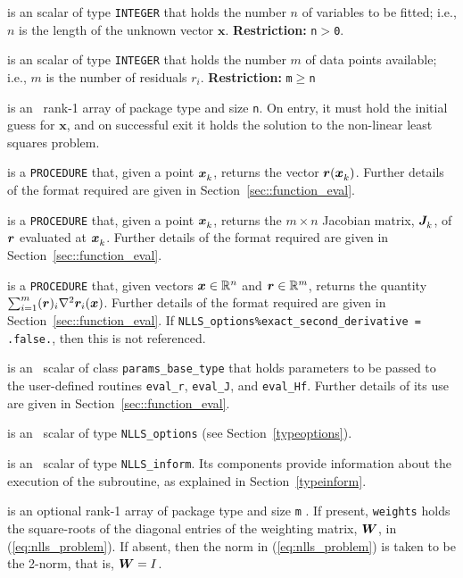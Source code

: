 \documentclass{spec}
\newcommand{\scalarintegerii}{is an \intentin scalar of type {\tt INTEGER} }
\newcommand{\ronearrayrealiiopt}[1]{is an optional \intentin rank-1 array of package type and size {\tt #1} }
\begin{document}
\begin{description}
 \scalarintegerii that holds the number $n$ of
variables to be fitted; i.e., $n$ is the length of the unknown vector $\bm x$.
\textbf{Restriction:} \texttt{n}$>${\tt 0}.

 \scalarintegerii that holds the number $m$ of
data points available; i.e., $m$ is the number of residuals $r_i$.
\textbf{Restriction:} \texttt{m}$\geq$\texttt{n}

 is an \intentinout\  rank-1 array of package type
and size {\tt n}.  On entry, it must hold the initial guess for $\bm x$, and on
successful exit it holds the solution to the non-linear least squares problem.

 is a {\tt PROCEDURE} that, given a point ${\bm x}_{k}^{}$, returns the vector ${\bm r}({\bm x}_{k}^{})$.
Further details of the format required are given in Section~\ref{sec::function_eval}.

 is a {\tt PROCEDURE} that, given a point ${\bm x}_{k}^{}$,
returns the $m \times n$ Jacobian matrix, ${\bm J}_{k}^{}$, of ${\bm r}$ evaluated at ${\bm x}_{k}^{}$.
Further details of the format required are given in Section~\ref{sec::function_eval}.

 is a {\tt PROCEDURE} that, given vectors ${\bm x} \in \mathbb{R}^n$
and ${\bm r} \in \mathbb{R}^m$, returns the quantity $\sum_{i=1}^m ({\bm r})_i \nabla^2 {\bm r}_i ({\bm x})$.
Further details of the format required are given in Section~\ref{sec::function_eval}.  If {\tt NLLS\_options\%exact\_second\_derivative = .false.}, then this is not referenced.

 is an \intentin\ scalar of class {\tt params\_base\_type} that holds parameters to
be passed to the user-defined routines {\tt eval\_r}, {\tt eval\_J}, and {\tt eval\_Hf}.
Further details of its use are given in Section~\ref{sec::function_eval}.

is an \intentin\  scalar  of type {\tt NLLS\_options}
(see Section~\ref{typeoptions}).

 is an \intentinout\ scalar of type
{\tt NLLS\_inform}. Its components provide information about the execution
of the subroutine, as explained in Section~\ref{typeinform}.

 \ronearrayrealiiopt{m}.  If present, {\tt weights} holds the square-roots of the
diagonal entries of the weighting matrix, ${\bm W}$, in (\ref{eq:nlls_problem}).  If absent, then the norm in (\ref{eq:nlls_problem}) is taken to be the 2-norm, that is, ${\bm W} = I$.

\end{description}
\end{document}
